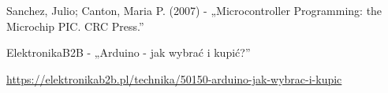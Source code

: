 \cleardoublepage
{}
{}
\begin{thebibliography}{999}
\begin{spacing}{1}
     Sanchez, Julio; Canton, Maria P. (2007) - „Microcontroller Programming: the Microchip PIC. CRC Press.”

     ElektronikaB2B - „Arduino - jak wybrać i kupić?”
    
    \url{https://elektronikab2b.pl/technika/50150-arduino-jak-wybrac-i-kupic}

\end{spacing}
\end{thebibliography}